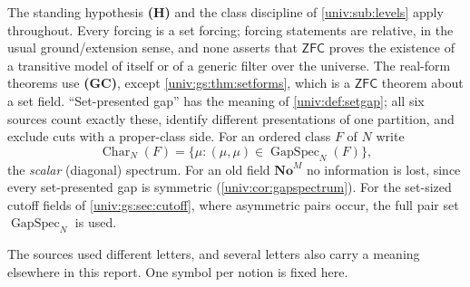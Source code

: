 \documentclass[11pt,letterpaper]{article}
\numberwithin{equation}{section}
\theoremstyle{definition}
\theoremstyle{remark}
\newcommand{\No}{\mathbf{No}}
\newcommand{\NoM}{\No^{M}}
\newcommand{\GapSpec}{\operatorname{GapSpec}}
\newcommand{\ZFC}{\mathsf{ZFC}}
\newcommand{\Char}{\operatorname{Char}}
\begin{document}
The standing hypothesis \textbf{(H)} and the class discipline of
\cref{univ:sub:levels} apply throughout. Every forcing is a set forcing; forcing
statements are relative, in the usual ground/extension sense, and none asserts
that $\ZFC$ proves the existence of a transitive model of itself or of a generic
filter over the universe. The real-form theorems use \textbf{(GC)}, except
\cref{univ:gs:thm:setforms}, which is a $\ZFC$ theorem about a set field.
``Set-presented gap'' has the meaning of \cref{univ:def:setgap}; all six sources
count exactly these, identify different presentations of one partition, and
exclude cuts with a proper-class side. For an ordered class $F$ of $N$ write
\[
 \Char_N(F)=\{\mu:(\mu,\mu)\in\GapSpec_N(F)\},
\]
the \emph{scalar} (diagonal) spectrum. For an old field $\NoM$ no information is
lost, since every set-presented gap is symmetric (\cref{univ:cor:gapspectrum}).
For the set-sized cutoff fields of \cref{univ:gs:sec:cutoff}, where asymmetric
pairs occur, the full pair set $\GapSpec_N$ is used.

The sources used different letters, and several letters also carry a meaning
elsewhere in this report. One symbol per notion is fixed here.
\end{document}

